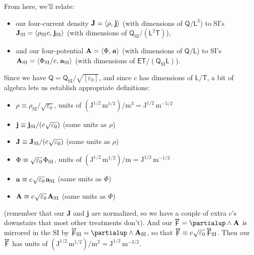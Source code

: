 \documentclass[12pt]{article}
\renewcommand{\vv}[1]{\mathbf{#1}}
\newcommand{\tightoverset}[2]{%
  \mathop{#2}\limits^{\vbox to -.5ex{\kern-0.75ex\hbox{$#1$}\vss}}}
\newcommand{\inlinedy}[1]{\tightoverset{\text{\tiny$\bm\leftrightarrow$}}{#1}}
\begin{document}
From here, we'll relate:
\begin{itemize}
\item our four-current density $\vv J = \langle \rho, \mkern2mu \vv j \rangle$ (with dimensions of $\mathsf{Q} / \mathsf{L}^3$) to SI's ${\vv J_{\textrm{SI}} = \langle \rho_{\textrm{SI}} \mkern.5mu c, \mkern2mu \vv j_{\textrm{SI}} \rangle}$ (with dimensions of $\mathsf{Q}_{\textrm{SI}}/(\mathsf{L}^2 \mathsf{T})$),
\item and our four-potential $\vv A = \langle \Phi, \mkern2mu \vv a \rangle$ (with dimensions of $\mathsf{Q}/\mathsf{L}$) to SI's ${\vv A_{\textrm{SI}} = \langle \Phi_{\textrm{SI}} / c, \mkern2mu \vv a_{\textrm{SI}} \rangle}$ (with dimensions of $\mathsf{E}\mathsf{T}/(\mathsf{Q}_{\textrm{SI}}\mathsf{L})$).
\end{itemize}
Since we have $\mathsf{Q} = \mathsf{Q}_{\textrm{SI}} / \sqrt{[\varepsilon_0]}$, and since $c$ has dimensions of $\mathsf{L}/\mathsf{T}$, a bit of algebra lets us establish appropriate definitions:
\begin{itemize}
\item $\rho \equiv \rho_{\textrm{SI}} / \sqrt{\varepsilon_0}$, units of $(\textrm{J}^{1/2} \, \textrm{m}^{1/2}) / \textrm{m}^3 = \textrm{J}^{1/2} \, \textrm{m}^{-5/2}$
\item $\vv j \equiv \vv j_{\textrm{SI}} / (c \mkern1mu \sqrt{\varepsilon_0})$ (same units as $\rho$)
\item $\vv J \equiv \vv J_{\textrm{SI}} / (c \mkern1mu \sqrt{\varepsilon_0})$ (same units as $\rho$)
\item $\Phi \equiv \sqrt{\varepsilon_0} \mkern2mu \Phi_{\textrm{SI}}$, units of $(\textrm{J}^{1/2} \, \textrm{m}^{1/2}) / \textrm{m} = \textrm{J}^{1/2} \, \textrm{m}^{-1/2}$
\item $\vv a \equiv c \mkern1mu \sqrt{\varepsilon_0} \mkern2mu \vv a_{\textrm{SI}}$ (same units as $\Phi$)
\item $\vv A \equiv c \mkern1mu \sqrt{\varepsilon_0} \mkern2mu \vv A_{\textrm{SI}}$ (same units as $\Phi$)
\end{itemize} 
(remember that our $\vv J$ and $\vv j$ are normalized, so we have a couple of extra $c$'s downstairs that most other treatments don't). And our $\inlinedy{\mathsf{F}} = \partialup \wedge \vv A$ is mirrored in the SI by $\inlinedy{\mathsf{F}} \mkern-4mu {}_{\textrm{SI}} = \partialup \wedge \vv A_{\textrm{SI}}$, so that $\inlinedy{\mathsf{F}} \equiv c \mkern1mu \sqrt{\varepsilon_0} \inlinedy{\mathsf{F}} \mkern-4mu {}_{\textrm{SI}}$. Then our $\inlinedy{\mathsf{F}}$ has units of $(\textrm{J}^{1/2} \, \textrm{m}^{1/2}) / \textrm{m}^2 = \textrm{J}^{1/2} \, \textrm{m}^{-3/2}$.
\end{document}

